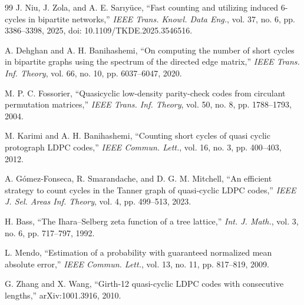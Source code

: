 \documentclass[conference]{IEEEtran}
\begin{document}
\begin{thebibliography}{99}
J. Niu, J. Zola, and A. E. Sar{\i}y\"uce,
``Fast counting and utilizing induced 6-cycles in bipartite networks,''
\emph{IEEE Trans. Knowl. Data Eng.}, vol. 37, no. 6,
pp. 3386--3398, 2025,
doi: 10.1109/TKDE.2025.3546516.

A. Dehghan and A. H. Banihashemi,
``On computing the number of short cycles in bipartite graphs
using the spectrum of the directed edge matrix,''
\emph{IEEE Trans. Inf. Theory}, vol. 66, no. 10,
pp. 6037--6047, 2020.

M. P. C. Fossorier,
``Quasicyclic low-density parity-check codes
from circulant permutation matrices,''
\emph{IEEE Trans. Inf. Theory}, vol. 50, no. 8,
pp. 1788--1793, 2004.

M. Karimi and A. H. Banihashemi,
``Counting short cycles of quasi cyclic protograph LDPC codes,''
\emph{IEEE Commun. Lett.}, vol. 16, no. 3,
pp. 400--403, 2012.

A. G\'omez-Fonseca, R. Smarandache, and D. G. M. Mitchell,
``An efficient strategy to count cycles in the Tanner graph
of quasi-cyclic LDPC codes,''
\emph{IEEE J. Sel. Areas Inf. Theory}, vol. 4,
pp. 499--513, 2023.

H. Bass,
``The Ihara--Selberg zeta function of a tree lattice,''
\emph{Int. J. Math.}, vol. 3, no. 6,
pp. 717--797, 1992.

L. Mendo,
``Estimation of a probability with guaranteed normalized
mean absolute error,''
\emph{IEEE Commun. Lett.}, vol. 13, no. 11,
pp. 817--819, 2009.

G. Zhang and X. Wang,
``Girth-12 quasi-cyclic LDPC codes with consecutive lengths,''
arXiv:1001.3916, 2010.

\end{thebibliography}
\end{document}
